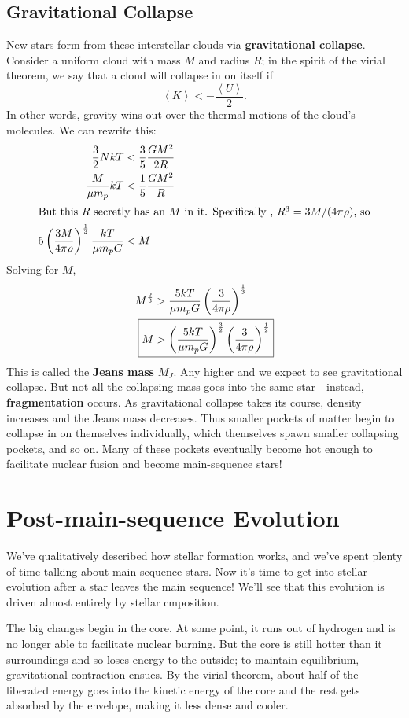 \documentclass[../a062main.tex]{subfiles}
\begin{document}
\subsection*{Gravitational Collapse}
New stars form from these interstellar clouds via \textbf{gravitational collapse}.
Consider a uniform cloud with mass $M$ and radius $R$; in the spirit of the virial theorem, we say that a cloud will collapse in on itself if
\[ \left< K \right> < -\frac{\left< U \right>}{2}. \]
In other words, gravity wins out over the thermal motions of the cloud's molecules.
We can rewrite this:
\begin{align*}
    \frac{3}{2} NkT &< \frac{3}{5} \frac{GM^2}{2R} \\
    \frac{M}{\mu m_p} kT &< \frac{1}{5} \frac{GM^2}{R} \\
    \intertext{But this $R$ secretly has an $M$ in it. Specifically , $R^3 = 3M / (4\pi \rho)$, so}
    5 \left( \frac{3M}{4\pi \rho} \right)^{\frac{1}{3}} \frac{kT}{\mu m_p G} &< M
\end{align*}
Solving for $M$,
\begin{align*}
    M^{\frac{2}{3}} &> \frac{5kT}{\mu m_p G} \left( \frac{3}{4\pi \rho} \right)^{\frac{1}{3}} \\
    \Aboxed{M &> \left( \frac{5kT}{\mu m_p G} \right)^{\frac{3}{2}} \left( \frac{3}{4\pi \rho} \right)^{\frac{1}{2}}}
\end{align*}
This is called the \textbf{Jeans mass} $M_J$.
Any higher and we expect to see gravitational collapse.
But not all the collapsing mass goes into the same star---instead, \textbf{fragmentation} occurs.
As gravitational collapse takes its course, density increases and the Jeans mass decreases.
Thus smaller pockets of matter begin to collapse in on themselves individually, which themselves spawn smaller collapsing pockets, and so on.
Many of these pockets eventually become hot enough to facilitate nuclear fusion and become main-sequence stars!

\section{Post-main-sequence Evolution}
We've qualitatively described how stellar formation works, and we've spent plenty of time talking about main-sequence stars.
Now it's time to get into stellar evolution after a star leaves the main sequence!
We'll see that this evolution is driven almost entirely by stellar cmposition.

The big changes begin in the core.
At some point, it runs out of hydrogen and is no longer able to facilitate nuclear burning.
But the core is still hotter than it surroundings and so loses energy to the outside; to maintain equilibrium, gravitational contraction ensues.
By the virial theorem, about half of the liberated energy goes into the kinetic energy of the core and the rest gets absorbed by the envelope, making it less dense and cooler.
\end{document}
